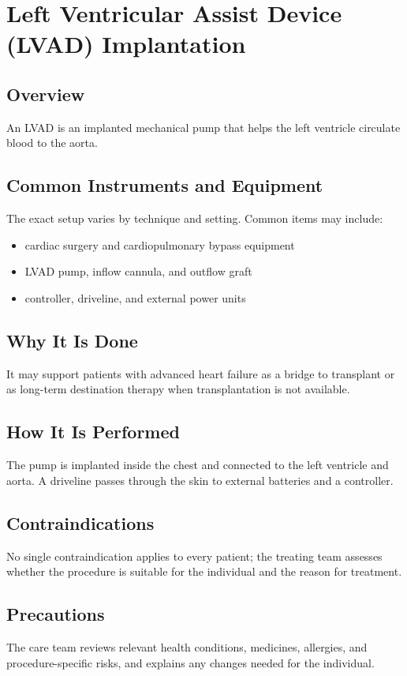 \chapter{Left Ventricular Assist Device (LVAD) Implantation}
\section*{Overview}
An LVAD is an implanted mechanical pump that helps the left ventricle circulate blood to the aorta.
\section*{Common Instruments and Equipment}
The exact setup varies by technique and setting. Common items may include:
\begin{itemize}[nosep,leftmargin=*]
  \item cardiac surgery and cardiopulmonary bypass equipment
  \item LVAD pump, inflow cannula, and outflow graft
  \item controller, driveline, and external power units
\end{itemize}

\section*{Why It Is Done}
It may support patients with advanced heart failure as a bridge to transplant or as long-term destination therapy when transplantation is not available.
\section*{How It Is Performed}
The pump is implanted inside the chest and connected to the left ventricle and aorta. A driveline passes through the skin to external batteries and a controller.
\section*{Contraindications}
No single contraindication applies to every patient; the treating team assesses whether the procedure is suitable for the individual and the reason for treatment.

\section*{Precautions}
The care team reviews relevant health conditions, medicines, allergies, and procedure-specific risks, and explains any changes needed for the individual.

